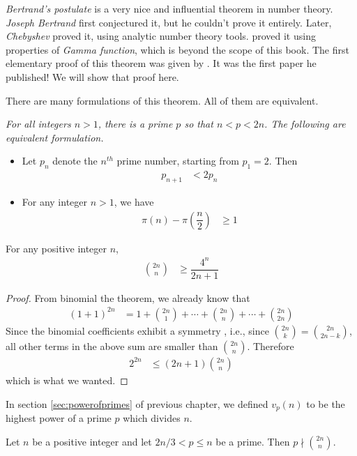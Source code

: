 \documentclass{subfile}
\begin{document}
	\label{sec:bertrandspostulate}
	\textit{Bertrand's postulate} is a very nice and influential theorem in number theory. \textit{Joseph Bertrand} first conjectured it, but he couldn't prove it entirely. Later, \textit{Chebyshev} proved it, using analytic number theory tools. \textcite{meher_murty_2013} proved it using properties of \textit{Gamma function}, which is beyond the scope of this book. The first elementary proof of this theorem was given by \textcite{erdos_1932}. It was the first paper he published! We will show that proof here.

	There are many formulations of this theorem. All of them are equivalent.

	\begin{theorem}\label{thm:bertrand}\slshape
		For all integers $n>1$, there is a prime $p$ so that $n<p<2n$. The following are equivalent formulation.
		\begin{itemize}
			\item Let $p_n$ denote the $n^{th}$ prime number, starting from $p_1=2$. Then
			\begin{align*}
				p_{n+1}
					& <2p_n
			\end{align*}
			\item For any integer $n >1$, we have
			\begin{align*}
				\pi(n)-\pi\left(\dfrac{n}{2}\right)
					& \geq1
			\end{align*}
		\end{itemize}
	\end{theorem}

	\begin{lemma}\label{lem:bertrand1}
		For any positive integer $n$,
			\begin{align*}
				\binom{2n}{n}
					& \geq\dfrac{4^n}{2n+1}
			\end{align*}
	\end{lemma}

	\begin{proof}
		From binomial the theorem, we already know that
		\begin{align*}
			(1+1)^{2n}
				& = 1+\binom{2n}1+\cdots+\binom{2n}{n}+\cdots+\binom{2n}{2n}
		\end{align*}
		Since the binomial coefficients exhibit a symmetry , i.e., since $\binom{2n}{k}=\binom{2n}{2n-k}$, all other terms in the above sum are smaller than $\binom{2n}{n}$. Therefore
			\begin{align*}
				2^{2n}
					& \leq(2n+1)\binom{2n}n
			\end{align*}
		which is what we wanted.

	\end{proof}
	In section \eqref{sec:powerofprimes} of previous chapter, we defined $v_p(n)$ to be the highest power of a prime $p$ which divides $n$.
	\begin{lemma}\label{lem:bertrand2}
		Let $n$ be a positive integer and let $2n/3<p\leq n$ be a prime. Then $p \nmid \binom{2n}n$.
	\end{lemma}
\end{document}
